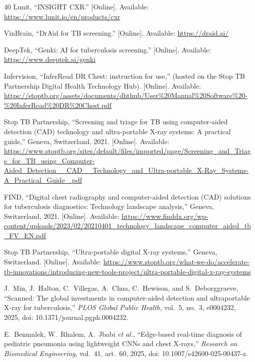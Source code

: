 \documentclass[conference, letterpaper]{IEEEtran}
\begin{document}
\begin{thebibliography}{40}
Lunit, ``INSIGHT CXR.'' [Online]. Available: \url{https://www.lunit.io/en/products/cxr}

VinBrain, ``DrAid for TB screening.'' [Online]. Available: \url{https://draid.ai/}

DeepTek, ``Genki: AI for tuberculosis screening.'' [Online]. Available: \url{https://www.deeptek.ai/genki}

Infervision, ``InferRead DR Chest: instruction for use,'' (hosted on the Stop TB Partnership Digital Health Technology Hub). [Online]. Available: \url{https://stoptb.org/assets/documents/dhthub/User\%20Manual\%20Software\%20-\%20InferRead\%20DR\%20Chest.pdf}

Stop TB Partnership, ``Screening and triage for TB using computer-aided detection (CAD) technology and ultra-portable X-ray systems: A practical guide,'' Geneva, Switzerland, 2021. [Online]. Available: \url{https://www.stoptb.org/sites/default/files/imported/page/Screening_and_Triage_for_TB_using_Computer-Aided_Detection__CAD__Technology_and_Ultra-portable_X-Ray_Systems-A_Practical_Guide_.pdf}

FIND, ``Digital chest radiography and computer-aided detection (CAD) solutions for tuberculosis diagnostics: Technology landscape analysis,'' Geneva, Switzerland, 2021. [Online]. Available: \url{https://www.finddx.org/wp-content/uploads/2023/02/20210401_technology_landscape_computer_aided_tb_FV_EN.pdf}

Stop TB Partnership, ``Ultra-portable digital X-ray systems,'' Geneva, Switzerland. [Online]. Available: \url{https://www.stoptb.org/what-we-do/accelerate-tb-innovations/introducing-new-tools-project/ultra-portable-digital-x-ray-systems}

J.~Min, J.~Halton, C.~Villegas, A.~Chua, C.~Hewison, and S.~Deborggraeve, ``Scanned: The global investments in computer-aided detection and ultraportable X-ray for tuberculosis,'' \textit{PLOS Global Public Health}, vol.~5, no.~3, e0004232, 2025, doi: 10.1371/journal.pgph.0004232.

E.~Benmalek, W.~Rhalem, A.~Jbabi \textit{et al.}, ``Edge-based real-time diagnosis of pediatric pneumonia using lightweight CNNs and chest X-rays,'' \textit{Research on Biomedical Engineering}, vol.~41, art.~60, 2025, doi: 10.1007/s42600-025-00437-z.


\end{thebibliography}
\end{document}
